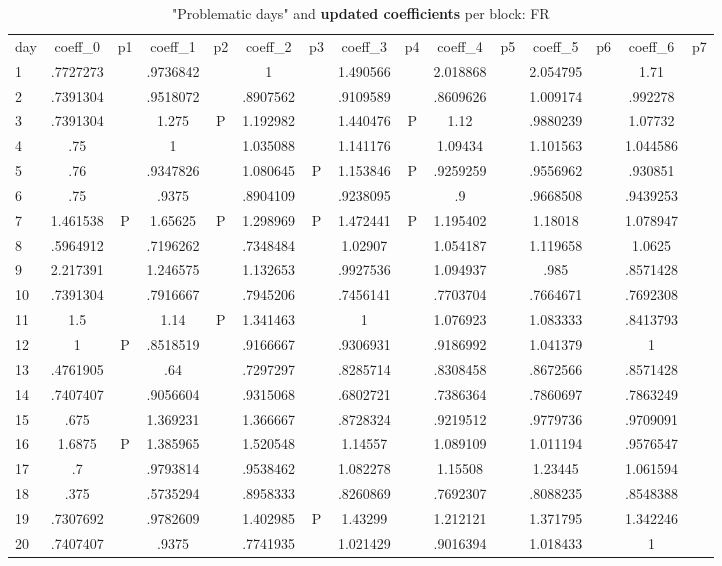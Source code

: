 \documentclass[a4paper,12pt]{article}
\begin{document}
\begin{landscape}
\begin{footnotesize}
\begin{center}
\begin{longtable}{l|cc|cc|cc|cc|cc|cc|cc|}
\caption{"Problematic days" and \textbf{updated coefficients} per block: FR\label{tab_fr_5}}
\hline
day&coeff\_0&p1&coeff\_1&p2&coeff\_2&p3&coeff\_3&p4&coeff\_4&p5&coeff\_5&p6&coeff\_6&p7 \\
1&.7727273&&.9736842&&1&&1.490566&&2.018868&&2.054795&&1.71& \\
2&.7391304&&.9518072&&.8907562&&.9109589&&.8609626&&1.009174&&.992278& \\
3&.7391304&&1.275&P&1.192982&&1.440476&P&1.12&&.9880239&&1.07732& \\
4&.75&&1&&1.035088&&1.141176&&1.09434&&1.101563&&1.044586& \\
5&.76&&.9347826&&1.080645&P&1.153846&P&.9259259&&.9556962&&.930851& \\
6&.75&&.9375&&.8904109&&.9238095&&.9&&.9668508&&.9439253& \\
7&1.461538&P&1.65625&P&1.298969&P&1.472441&P&1.195402&&1.18018&&1.078947& \\
8&.5964912&&.7196262&&.7348484&&1.02907&&1.054187&&1.119658&&1.0625& \\
9&2.217391&&1.246575&&1.132653&&.9927536&&1.094937&&.985&&.8571428& \\
10&.7391304&&.7916667&&.7945206&&.7456141&&.7703704&&.7664671&&.7692308& \\
11&1.5&&1.14&P&1.341463&&1&&1.076923&&1.083333&&.8413793& \\
12&1&P&.8518519&&.9166667&&.9306931&&.9186992&&1.041379&&1& \\
13&.4761905&&.64&&.7297297&&.8285714&&.8308458&&.8672566&&.8571428& \\
14&.7407407&&.9056604&&.9315068&&.6802721&&.7386364&&.7860697&&.7863249& \\
15&.675&&1.369231&&1.366667&&.8728324&&.9219512&&.9779736&&.9709091& \\
16&1.6875&P&1.385965&&1.520548&&1.14557&&1.089109&&1.011194&&.9576547& \\
17&.7&&.9793814&&.9538462&&1.082278&&1.15508&&1.23445&&1.061594& \\
18&.375&&.5735294&&.8958333&&.8260869&&.7692307&&.8088235&&.8548388& \\
19&.7307692&&.9782609&&1.402985&P&1.43299&&1.212121&&1.371795&&1.342246& \\
20&.7407407&&.9375&&.7741935&&1.021429&&.9016394&&1.018433&&1& \\

\end{longtable}
\end{center}
\end{footnotesize}
\end{landscape}
\end{document}
